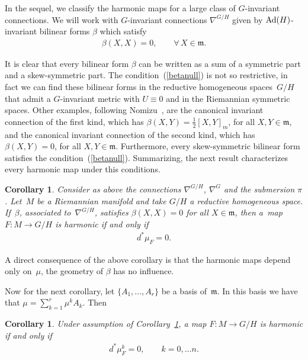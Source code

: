 \documentclass[10pt,a4paper]{amsart}
\numberwithin{equation}{section}
\newtheorem{Corollary}[Theorem]{Corollary}
\newcommand{\m}{\mathfrak{m}}
\begin{document}
In the sequel, we classify the harmonic maps for a large class of $G$-invariant connections. We will work with $G$-invariant connections $\nabla^{G/H}$ given by ${\rm Ad}(H)$-invariant bilinear forms $\beta$ which satisfy
\begin{gather}\label{betanull}
  \beta(X,X) = 0,\qquad \forall\, X \in \m.
\end{gather}

It is clear that every bilinear form $\beta$ can be written as a sum
of a symmetric part and a skew-symmetric part. The condition~(\ref{betanull}) is not so restrictive, in fact we can f\/ind these
bilinear forms in the   reductive homogeneous spaces~$G/H$ that
admit a $G$-invariant metric with $U \equiv 0$ and in the Riemannian
symmetric spaces. Other examples, following Nomizu~\cite{Nomizu},
are the canonical invariant connection of the f\/irst kind,  which has
$\beta(X,Y)= \frac{1}{2}[X,Y]_{m}$, for all $X,Y \in \m$, and the
canonical invariant connection of the second kind, which has
$\beta(X,Y) = 0$, for all $X,Y \in \m$. Furthermore, every
skew-symmetric bilinear form satisf\/ies the condition~(\ref{betanull}). Summarizing,
 the next result characterizes every harmonic map under this conditions.

\begin{Corollary}\label{corollarybetanull}
  Consider as above the connections $\nabla^{G/H}$, $\nabla^{G}$ and the submersion $\pi$. Let~$M$ be a Riemannian manifold and take $G/H$ a reductive homogeneous space. If~$\beta$, associated to~$\nabla^{G/H}$, satisfies $\beta(X,X)= 0$ for all $X \in \m$, then a~map   $F\colon M \rightarrow G/H$ is harmonic if and only if
  \begin{gather*}
    d^{*}\mu_{F} = 0.
  \end{gather*}
\end{Corollary}

A direct consequence of the above corollary is that the harmonic maps depend only on~$\mu$, the geometry of $\beta$ has no inf\/luence.

Now for the next corollary, let $\{A_1, \ldots, A_r\}$ be a basis of~$\m$. In this basis we have that $\mu = \sum\limits_{k=1}^{r}\mu^{k} A_k$.
Then

\begin{Corollary}
  Under assumption of Corollary~{\rm \ref{corollarybetanull}}, a map $F\colon M \rightarrow G/H$ is harmonic if and only if
  \begin{gather*}
    d^{*}\mu_{F}^k = 0,\qquad k=0,\ldots n.
  \end{gather*}
\end{Corollary}
\end{document}
